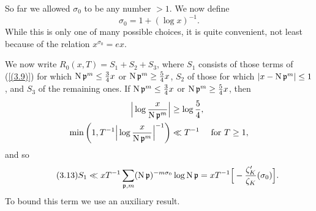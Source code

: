 \documentclass[./main]{subfiles}
\begin{document}
So far we allowed $\sigma_0$ to be any number $>1$. We now define
\[\tag{3.12} \label{(3.12)} \sigma_0=1+(\log x)^{-1}.\]
While this is only one of many possible choices, it is quite convenient, not least because of the relation $x^{\sigma_0}=ex$.

We now write $R_0(x,T)=S_1+S_2+S_3$, where $S_1$ consists of those terms of (\ref{(3.9)}) for which $\operatorname{N}\mathfrak{p}^m \le \frac{3}{4}x$ or $\operatorname{N}\mathfrak{p}^m \ge \frac{5}{4}x$, $S_2$ of those for which $|x-\operatorname{N}\mathfrak{p}^m|\le 1$, and $S_3$ of the remaining ones. If $\operatorname{N}\mathfrak{p}^m \le \frac{3}{4}x$ or $\operatorname{N}\mathfrak{p}^m\ge \frac{5}{4}x$, then
\begin{align*}
\Big|\log\frac{x}{\operatorname{N}\mathfrak{p}^m}\Big|&\ge \log\frac{5}{4},\\
\min\bigg(1, T^{-1}\Big|\log \frac{x}{\operatorname{N}\mathfrak{p}^m}\Big|^{-1}\bigg)&\ll T^{-1} \quad\text{ for } T\ge 1,
\end{align*}
and so
\[\tag{3.13}\label{(3.13)}
    S_1 \ll xT^{-1} \sum_{\mathfrak{p}, m} (\operatorname{N}\mathfrak{p})^{-m\sigma_0} \log \operatorname{N}\mathfrak{p}
    = xT^{-1}\Big[-\frac{\zeta_K' }{\zeta_K}(\sigma_0)\Big].
\]
To bound this term we use an auxiliary result.
\end{document}
